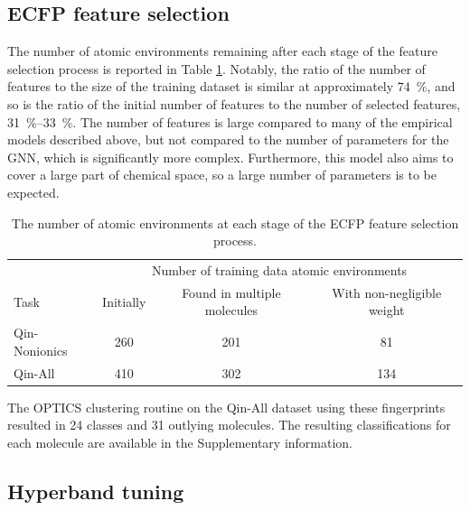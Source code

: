 \subsection{ECFP feature selection}

The number of atomic environments remaining after each stage of the feature selection process is reported in Table \ref{tab:ecfp-fs}. Notably, the ratio of the number of features to the size of the training dataset is similar at
approximately \SI{74}{\%}, and so is the ratio of the initial number of features to the number of selected features, \SIrange{31}{33}{\%}. The number of features is large compared to many of the empirical models described above, but not compared to the number of parameters for the GNN, which is significantly more complex. Furthermore, this model also aims to cover a large part of chemical space, so a large number of parameters is to be expected.

\begin{table}
    \centering
    \caption{The number of atomic environments at each stage of the ECFP feature selection process.}
    \label{tab:ecfp-fs}
    \begin{tabular}{@{}lccc@{}} \toprule
                      & \multicolumn{3}{c}{Number of training data atomic environments}                                                            \\\cmidrule(l){2-4}
        Task          & Initially                                                       & Found in multiple molecules & With non-negligible weight \\\midrule
        Qin-Nonionics & 260                                                             & 201                         & 81                         \\
        Qin-All       & 410                                                             & 302                         & 134                        \\\bottomrule
    \end{tabular}
\end{table}

The OPTICS clustering routine on the Qin-All dataset using these fingerprints
resulted in 24 classes and 31 outlying molecules. The resulting classifications
for each molecule are available in the Supplementary information.

\subsection{Hyperband tuning}


